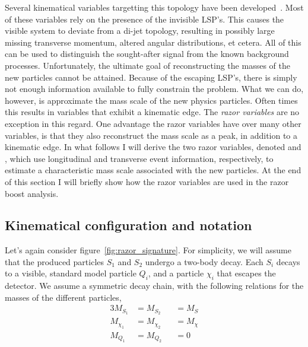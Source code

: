Several kinematical variables targetting this topology have been
developed~\cite{Lester:1999tx,Barr:2003rg,Randall:2008rw,Polesello:2009rn,Bai:2012gs}.
Most of these variables rely on the presence of the invisible LSP's. This causes the visible system
to deviate from a di-jet topology, resulting in possibly large missing transverse momentum, altered
angular distributions, et cetera. All of this can be used to distinguish the sought-after signal
from the known background processes. 
Unfortunately, the ultimate goal of reconstructing the masses of the new particles cannot be
attained. Because of the escaping LSP's, there is simply not enough information available to fully
constrain the problem. What we can do, however, is approximate the mass scale of the new physics
particles. Often times this results in variables that exhibit a kinematic edge. 
The \textit{razor variables} \cite{rogan,Rogan:1557072,Chatrchyan:2011ek,Chatrchyan:2014goa} are no
exception in this regard. One advantage the razor variables have over many other variables, is that
they also reconstruct the mass scale as a peak, in addition to a kinematic edge. 
In what follows I will derive the two razor variables, denoted \mr and \rsq, which use longitudinal
and transverse event information, respectively, to estimate a characteristic mass scale associated
with the new particles. At the end of this section I will briefly show how the razor variables are
used in the razor boost analysis. 


\subsection{Kinematical configuration and notation \label{sec:razor_notation}}

Let's again consider figure~\ref{fig:razor_signature}. For simplicity, we will assume that the
produced particles $S_1$ and $S_2$ undergo a two-body decay. Each $S_i$ decays to a visible,
standard model particle $Q_i$, and a particle $\chi_i$ that escapes the detector. 
We assume a symmetric decay chain, with the following relations for the masses of the different
particles,
\begin{alignat}{3}
  M_{S_1} &= M_{S_2} &&= M_S \label{eq:equal_S_masses}\\
  M_{\chi_1} &= M_{\chi_2} &&= M_{\chi} \label{eq:equal_chi_masses}\\
  M_{Q_1} &= M_{Q_2} &&= 0 \label{eq:no_Q_masses}
\end{alignat}

